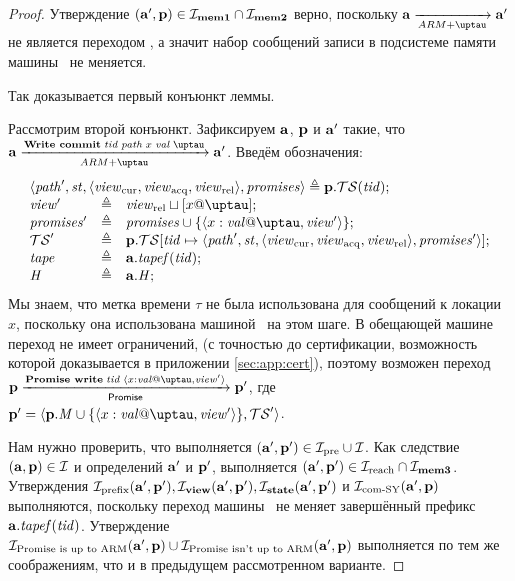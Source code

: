 \begin{proof}
  Утверждение $(\mathbf{a}', \mathbf{p}) \in \mathcal{I}_{\rm \bf mem1} \cap \mathcal{I}_{\rm \bf mem2}$ верно, поскольку $\aT \armStepgen{} \aT'$ не
  является переходом , а значит набор сообщений записи в подсистеме памяти машины \ARMt~не меняется.
  
  Так доказывается первый конъюнкт леммы.
  
  Рассмотрим второй конъюнкт.
  Зафиксируем $\mathbf{a}$, $\mathbf{p}$ и $\mathbf{a}'$ такие, что $\aT \armStepWriteCommit \aT'$.
  Введём обозначения:
\[
\begin{array}{l l l}
\multicolumn{3}{l}{\angled{\cpath', \PromState, \angled{\Rcur, \Racq, \Rrel}, \PromSet} \triangleq \p.\TSfprom(\tId);}\\
\R' & \triangleq & \Rrel \sqcup [x @ \tau]; \\
\PromSet' & \triangleq & \PromSet \cup \{\writeEvt{x}{\stval}{\tau}{\R'}\}; \\
\TSfprom' & \triangleq & \p.\TSfprom[\tId \mapsto \angled{\cpath', \PromState, \angled{\Rcur, \Racq, \Rrel}, \PromSet'}]; \\
\tape     & \triangleq & \aT.\tapef(\tId); \\
\hmap     & \triangleq & \aT.\hmap; \\
\end{array}
\]
Мы знаем, что метка времени $\tau$ не была использована для сообщений к локации $x$,
поскольку она использована машиной \ARMt~на этом шаге.
В обещающей машине переход  не имеет ограничений,
(с точностью до сертификации, возможность которой доказывается в приложении \ref{sec:app:cert}),
поэтому возможен переход $\p \promStepPromiseRPrime \p'$,
где $\p' = \angled{\p.\Mprom \cup \{\writeEvt{x}{\stval}{\tau}{\R'}\}, \TSfprom'}$.

Нам нужно проверить, что выполняется $(\mathbf{a}', \mathbf{p}') \in \mathcal{I}_{\textup{\rm pre}} \cup \mathcal{I}$.
Как следствие $(\mathbf{a}, \mathbf{p}) \in \mathcal{I}$ и определений $\mathbf{a}'$ и $\mathbf{p}'$, выполняется $(\mathbf{a}', \mathbf{p}') \in \mathcal{I}_{\textup{\rm reach}} \cap \mathcal{I}_{\rm \bf mem3}$.
Утверждения $\mathcal{I}_{\textup{\rm prefix}}(\mathbf{a}', \mathbf{p}'), \mathcal{I}_{\rm \bf view}(\mathbf{a}', \mathbf{p}'), \mathcal{I}_{\rm \bf state}(\mathbf{a}', \mathbf{p}')$ и $\mathcal{I}_{\textup{\rm com-SY}}(\mathbf{a}', \mathbf{p})$ выполняются,
поскольку переход  машины \ARMt~не меняет завершённый префикс $\mathbf{a}.\mathit{tapef}(\mathit{tid})$.
Утверждение $\mathcal{I}_{\textup{\rm Promise is up to ARM}}(\mathbf{a}', \mathbf{p}) \cup \mathcal{I}_{\textup{\rm Promise isn't up to ARM}}(\mathbf{a}', \mathbf{p})$ выполняется по тем же соображениям, что
и в предыдущем рассмотренном варианте.


\end{proof}
